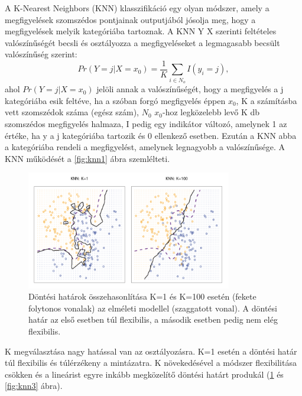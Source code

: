 \documentclass[12pt]{article}
\theoremstyle{plain}
\begin{document}
A K-Nearest Neighbors (KNN) klasszifikáció egy olyan módszer, amely a megfigyelések szomszédos pontjainak outputjából jósolja meg, hogy a megfigyelések melyik kategóriába tartoznak.  A KNN Y X szerinti feltételes valószínűségét becsli és osztályozza a megfigyeléseket a legmagasabb becsült valószínűség szerint: 
$$ Pr(Y=j | X = x_0) = \frac{1}{K} \sum_{i \in N_o} I(y_i = j), $$ ahol $Pr(Y=j | X = x_0) $ jelöli annak a valószínűségét, hogy a megfigyelés a j kategóriába esik feltéve, ha a szóban forgó megfigyelés éppen $x_0$, K a számításba vett szomszédok száma (egész szám), $N_0 $ $x_0$-hoz legközelebb levő K db szomszédos megfigyelés halmaza, I pedig egy indikátor változó, amelynek 1 az értéke, ha y a j kategóriába tartozik és 0 ellenkező esetben. Ezután a KNN abba a kategóriába rendeli a megfigyelést, amelynek legnagyobb a valószínűsége. A KNN működését a \ref{fig:knn1} ábra szemlélteti. 

\begin{figure}
    \begin{center}
    \includegraphics[width=0.8\textwidth]{media/knn2.png}
    \caption{Döntési határok összehasonlítása K=1 és K=100 esetén (fekete folytonos vonalak) az elméleti modellel (szaggatott vonal). A döntési határ az első esetben túl flexibilis, a második esetben pedig nem elég flexibilis. } 
    \label{fig:knn2}
    \end{center}
\end{figure}

K megválasztása nagy hatással van az osztályozásra. K=1 esetén a döntési határ túl flexibilis és túlérzékeny a mintázatra. K növekedésével a módszer flexibilitása csökken és a lineárist egyre inkább megközelítő döntési határt produkál (\ref{fig:knn2} és \ref{fig:knn3} ábra). 
\end{document}
